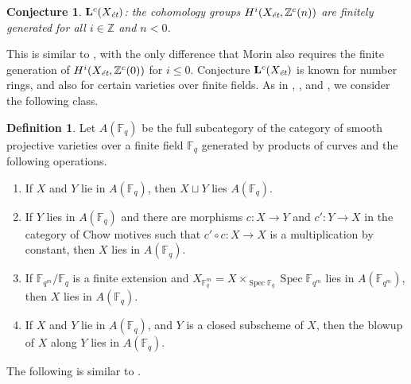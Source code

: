 \documentclass[leqno,12pt]{article}
\theoremstyle{plain}
\newtheorem{conjecture}[theorem]{\indent\sc Conjecture}
\theoremstyle{definition}
\newtheorem{definition}[theorem]{\indent\sc Definition}
\DeclareMathOperator{\Spec}{Spec}
\newcommand{\FF}{\mathbb{F}}
\newcommand{\ZZ}{\mathbb{Z}}
\newcommand{\et}{\text{\it \'{e}t}}
\begin{document}
\begin{conjecture}
  $\mathbf{L}^c (X_\et)$: the cohomology groups $H^i (X_\et, \ZZ^c (n))$ are
  finitely generated for all $i \in \ZZ$ and $n < 0$.
\end{conjecture}

This is similar to \cite[Definition~5.8]{Morin-2014}, with the only difference
that Morin also requires the finite generation of $H^i (X_\et, \ZZ^c (0))$ for
$i \le 0$. Conjecture $\mathbf{L}^c (X_\et)$ is known for number rings, and also
for certain varieties over finite fields. As in \cite{Soule-1984},
\cite{Geisser-2004}, and \cite{Morin-2014}, we consider the following class.

\begin{definition}
  Let $A (\FF_q)$ be the full subcategory of the category of smooth projective
  varieties over a finite field $\FF_q$ generated by products of curves and the
  following operations.
  \begin{enumerate}
  \item[1)] If $X$ and $Y$ lie in $A (\FF_q)$, then $X \sqcup Y$ lies
    $A (\FF_q)$.
  \item[2)] If $Y$ lies in $A (\FF_q)$ and there are morphisms $c\colon X\to Y$
    and $c'\colon Y\to X$ in the category of Chow motives such that
    $c'\circ c\colon X\to X$ is a multiplication by constant, then
    $X$ lies in $A (\FF_q)$.
  \item[3)] If $\FF_{q^m}/\FF_q$ is a finite extension and
    $X_{\FF_q^m} = X \times_{\Spec \FF_q} \Spec \FF_{q^m}$ lies in
    $A (\FF_{q^m})$, then $X$ lies in $A (\FF_q)$.
  \item[4)] If $X$ and $Y$ lie in $A (\FF_q)$, and $Y$ is a closed subscheme of
    $X$, then the blowup of $X$ along $Y$ lies in $A (\FF_q)$.
  \end{enumerate}
\end{definition}

The following is similar to \cite[Definition~5.9]{Morin-2014}.
\end{document}
